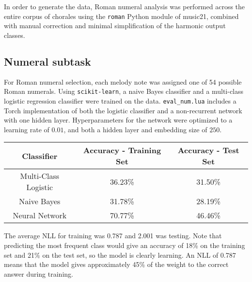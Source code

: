 \documentclass[12pt]{article}
\begin{document}
In order to generate the data, Roman numeral analysis was performed across the entire corpus of chorales using the \texttt{roman} Python module of music21, combined with manual correction and minimal simplification of the harmonic output classes.

\begin{center}
\end{center}

\subsection{Numeral subtask}

For Roman numeral selection, each melody note was assigned one of 54 possible Roman numerals. Using \texttt{scikit-learn}, a naive Bayes classifier and a multi-class logistic regression classifier were trained on the data. \texttt{eval\_num.lua} includes a Torch implementation of both the logistic classifier and a non-recurrent network with one hidden layer. Hyperparameters for the network were optimized to a learning rate of $0.01$, and both a hidden layer and embedding size of $250$.

\begin{center}
	\begin{tabular}{ c | c | c }
		\textbf{Classifier} & \textbf{Accuracy - Training Set} & \textbf{Accuracy - Test Set} \\ \hline
		Multi-Class Logistic & 36.23\% & 31.50\% \\ \hline
		Naive Bayes & 31.78\% & 28.19\% \\ \hline
		Neural Network & 70.77\% & 46.46\%
	\end{tabular}
\end{center}	

The average NLL for training was 0.787 and 2.001 was testing. Note that predicting the most frequent class would give an accuracy of 18\% on the training set and 21\%  on the test set, so the model is clearly learning. An NLL of 0.787 means that the model gives approximately 45\% of the weight to the correct answer during training.
\end{document}

